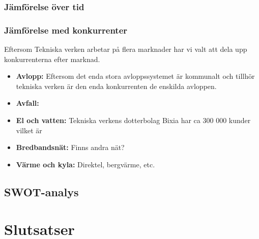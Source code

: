 \documentclass[10pt,a4paper]{article}
\begin{document}
\subsubsection{Jämförelse över tid}


\subsubsection{Jämförelse med konkurrenter}
Eftersom Tekniska verken arbetar på flera marknader har vi valt att dela upp konkurrenterna efter marknad.
\begin{itemize}
	\item \textbf{Avlopp:} 
		Eftersom det enda stora avloppssystemet är kommunalt och tillhör tekniska verken är den enda konkurrenten de enskilda avloppen.
	\item \textbf{Avfall:} 
	\item \textbf{El och vatten:} 
		Tekniska verkens dotterbolag Bixia har ca 300 000 kunder vilket är %
	\item \textbf{Bredbandsnät:}
		Finns andra nät?
	\item \textbf{Värme och kyla:}
		Direktel, bergvärme, etc.
\end{itemize}


\subsection{SWOT-analys}

\section{Slutsatser}

\newpage
\end{document}
